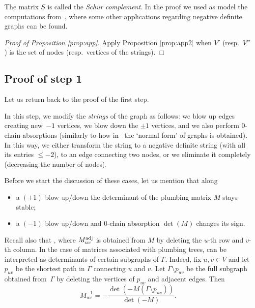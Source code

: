 \documentclass[10pt,a4paper]{amsart}
\begin{document}
The matrix $S$ is called the \emph{Schur complement}. In the proof we used as model the computations from~\cite[p.~526]{Nem22}, where some other applications regarding negative definite graphs can be found.

 \begin{proof}[Proof of Proposition \ref{prop:app}]
Apply Proposition \ref{prop:app2} when $V'$ (resp.\ $V''$) is the set of
 nodes (resp.\ vertices of the strings).
\end{proof}

\subsection{Proof of step 1}\label{ss:8.4}
Let us return back to the proof of the first step.

In this step, we modify the {\it strings}
of the graph as follows: we blow up edges creating new~$-1$ vertices,
we blow down the $\pm 1$ vertices, and we also perform 0-chain absorptions
(similarly to
how in~\cite[Theorem~4.1]{Neu81} the `normal form' of graphs is obtained).
In this way, we either transform the string to a negative definite
string (with all its entries $\leq -2$), to an edge connecting two nodes, or we eliminate it completely
(decreasing the number of nodes).

Before we start the discussion of these cases, let us mention that along
\begin{itemize}\itemsep=0pt
 \item a $(+1)$ blow up/down the determinant of the plumbing matrix $M$
stays stable;
 \item a $(-1)$ blow up/down and 0-chain absorption $\det(M)$ changes its sign.
\end{itemize}

Recall also that ,
where $M^{\rm adj}_{uv}$ is obtained from $M$ by deleting the $u$-th row and $v$-th column. In the case of matrices associated with plumbing trees,
 can be interpreted as determinants of certain subgraphs of $\Gamma$. Indeed,
fix $u,v\in V$ and let $p_{uv}$ be the shortest path in $\Gamma$ connecting $u$ and $v$. Let $\Gamma\setminus p_{uv}$ be the full subgraph obtained from~$\Gamma$ by deleting the vertices of $p_{uv}$ and adjacent edges.
Then
\begin{equation}\label{eq:app1}
M^{-1}_{uv}=-\frac{\det(-M(\Gamma\setminus p_{uv}))}{\det(-M)}.
\end{equation}
\end{document}
